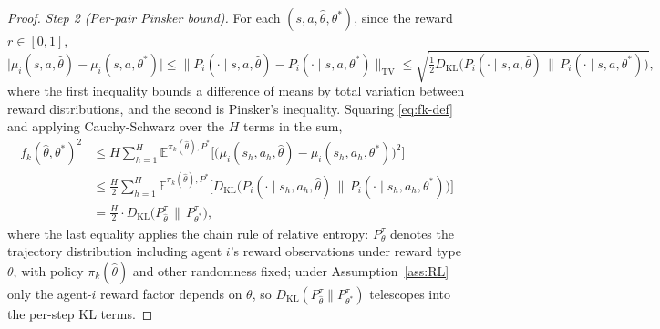 \begin{proof}
\textit{Step 2 (Per-pair Pinsker bound).} For each $(s, a, \hat{\theta}, \theta^*)$, since the reward $r \in [0, 1]$,
\begin{equation}
\big|\mu_i(s, a, \hat{\theta}) - \mu_i(s, a, \theta^*)\big| \leq \|P_i(\cdot \mid s, a, \hat{\theta}) - P_i(\cdot \mid s, a, \theta^*)\|_{\mathrm{TV}} \leq \sqrt{\tfrac{1}{2} D_{\mathrm{KL}}\big(P_i(\cdot \mid s, a, \hat{\theta}) \,\big\|\, P_i(\cdot \mid s, a, \theta^*)\big)},
\end{equation}
where the first inequality bounds a difference of means by total variation between reward distributions, and the second is Pinsker's inequality. Squaring \eqref{eq:fk-def} and applying Cauchy-Schwarz over the $H$ terms in the sum,
\begin{align}
f_k(\hat{\theta}, \theta^*)^2 &\leq H \sum_{h=1}^H \mathbb{E}^{\pi_k(\hat{\theta}), P^*}\big[\big(\mu_i(s_h, a_h, \hat{\theta}) - \mu_i(s_h, a_h, \theta^*)\big)^2\big] \\
&\leq \tfrac{H}{2} \sum_{h=1}^H \mathbb{E}^{\pi_k(\hat{\theta}), P^*}\big[D_{\mathrm{KL}}\big(P_i(\cdot \mid s_h, a_h, \hat{\theta}) \,\big\|\, P_i(\cdot \mid s_h, a_h, \theta^*)\big)\big] \\
\label{eq:fk-KL-traj}
&= \tfrac{H}{2} \cdot D_{\mathrm{KL}}\big(P_{\hat{\theta}}^{\tau} \,\big\|\, P_{\theta^*}^{\tau}\big),
\end{align}
where the last equality applies the chain rule of relative entropy: $P_\theta^\tau$ denotes the trajectory distribution including agent $i$'s reward observations under reward type $\theta$, with policy $\pi_k(\hat{\theta})$ and other randomness fixed; under Assumption~\ref{ass:RL} only the agent-$i$ reward factor depends on $\theta$, so $D_{\mathrm{KL}}(P_{\hat{\theta}}^\tau \| P_{\theta^*}^\tau)$ telescopes into the per-step KL terms.


\end{proof}
